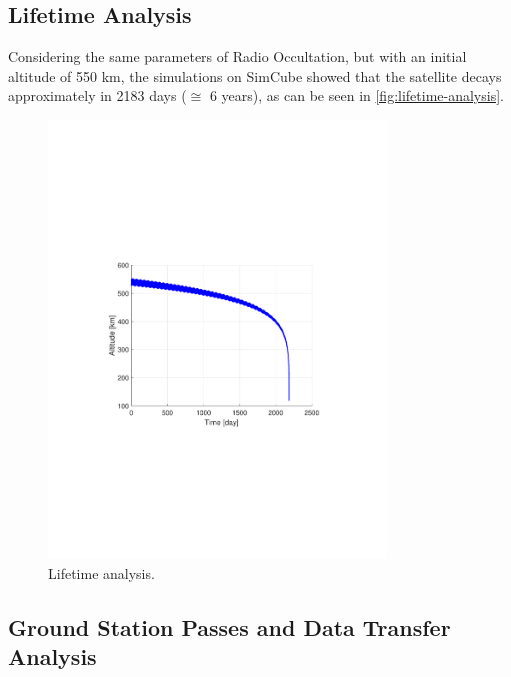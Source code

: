 
\subsection{Lifetime Analysis}

Considering the same parameters of Radio Occultation, but with an initial altitude of 550 km, the simulations on SimCube showed that the satellite decays approximately in 2183 days ($\cong$ 6 years), as can be seen in \autoref{fig:lifetime-analysis}.

\begin{figure}[!ht]
    \begin{center}
        \includegraphics[trim=3.5cm 8cm 4.0cm 8cm,clip, width=0.8\textwidth]{curves/Altitude.pdf}
        \caption{Lifetime analysis.}
        \label{fig:lifetime-analysis}
    \end{center}
\end{figure}

\subsection{Ground Station Passes and Data Transfer Analysis}


